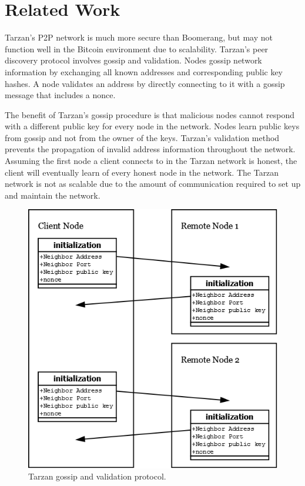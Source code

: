 \section{Related Work}
Tarzan’s P2P network is much more secure than Boomerang, but may not function well in the Bitcoin environment due to scalability. Tarzan’s peer discovery protocol involves gossip and validation. Nodes gossip network information by exchanging all known addresses and corresponding public key hashes. A node validates an address by directly connecting to it with a gossip message that includes a nonce.

The benefit of Tarzan’s gossip procedure is that malicious nodes cannot respond with a different public key for every node in the network. Nodes learn public keys from gossip and not from the owner of the keys. Tarzan’s validation method prevents the propagation of invalid address information throughout the network. Assuming the first node a client connects to in the Tarzan network is honest, the client will eventually learn of every honest node in the network. The Tarzan network is not as scalable due to the amount of communication required to set up and maintain the network.

\begin{figure}[ht!]
\begin{center}
\includegraphics[scale=0.3]{./images/tarzan_protocol.png}
\caption{Tarzan gossip and validation protocol.}
\label{fig:tarzan_protocol}
\end{center}
\end{figure}

